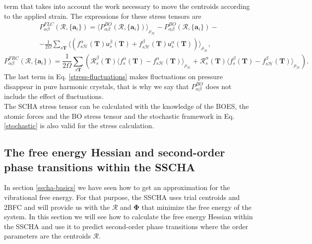 term that takes into account the work necessary to move the centroids according to the applied strain. The expressions for these stress tensors are
\begin{multline}
 \label{stress-fluctuations}
 P_{\alpha\beta}^{FLC}(\boldsymbol{\mathcal{R}},\{\mathbf{a}_{i}\})=\langle P_{\alpha\beta}^{BO}(\boldsymbol{\mathcal{R}},\{\mathbf{a}_{i}\})\rangle_{\rho_{\mathcal{H}}}-
 P_{\alpha\beta}^{BO}(\boldsymbol{\mathcal{R}},\{\mathbf{a}_{i}\})- \\ -\frac{1}{2\Omega}\sum_{s\mathbf{T}}\langle(f_{s\mathcal{H}}^{\alpha}(\mathbf{T})\mathsf{u}_{s}^{\beta}(\mathbf{T})+
 f_{s\mathcal{H}}^{\beta}(\mathbf{T})\mathsf{u}_{s}^{\alpha}(\mathbf{T}))\rangle_{\rho_{\mathcal{H}}},
\end{multline}
\begin{equation}
 P_{\alpha\beta}^{FRC}(\boldsymbol{\mathcal{R}},\{\mathbf{a}_{i}\})=\frac{1}{2\Omega}\sum_{s\mathbf{T}}(\mathcal{R}_{s}^{\beta}(\mathbf{T})\langle f_{s}^{\alpha}(\mathbf{T})-f_{s\mathcal{H}}^{\alpha}(\mathbf{
 T})\rangle_{\rho_{\mathcal{H}}}+\mathcal{R}_{s}^{\alpha}(\mathbf{T})\langle f_{s}^{\beta}(\mathbf{T})-f_{s\mathcal{H}}^{\beta}(\mathbf{T})\rangle_{\rho_{\mathcal{H}}}).
\end{equation}
The last term in Eq. \ref{stress-fluctuations} makes fluctuations on pressure disappear in pure harmonic crystals\cite{monacelli2018pressure}, that is why we say that $P_{\alpha\beta}^{BO}$ does not include the effect
of fluctuations. \\

The SCHA stress tensor can be calculated with the knowledge of the BOES, the atomic forces and the BO stress tensor and the stochastic framework in Eq. \ref{stochastic} is also valid for the stress calculation. 

\subsection{The free energy Hessian and second-order phase transitions within the SSCHA}

In section \ref{sscha-basics} we have seen how to get an approximation for the vibrational free energy. For that purpose, the SSCHA uses trial centroids and 2BFC and will provide us with the $\boldsymbol{\mathcal{R}}$ 
and $\boldsymbol{\Phi}$ that minimize the free energy of the system. In this section we will see 
how to calculate the free energy Hessian within the SSCHA and use it to predict second-order phase transitions where the order parameters are the centroids $\boldsymbol{\mathcal{R}}$. \\

